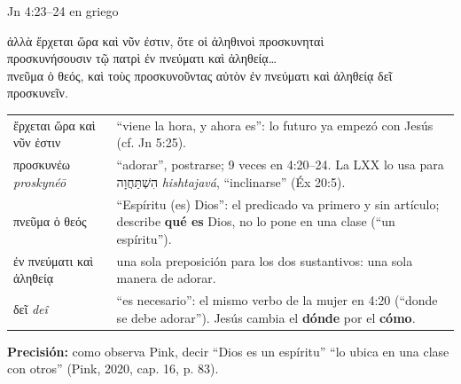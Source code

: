 \documentclass[hyperref={bookmarks=false},aspectratio=169]{beamer}
\newcommand{\heb}[1]{\mbox{\foreignlanguage{hebrew}{#1}}}
\newcommand{\grc}[1]{\foreignlanguage{ancientgreek}{#1}}
\newcommand{\destacar}[1]{\textbf{\textcolor{azul}{#1}}}
\newcommand{\precision}[1]{{\footnotesize\color{gris}\textbf{Precisión:} #1}}
\begin{document}
\begin{frame}{Jn 4:23--24 en griego}
\begin{center}\grc{ἀλλὰ ἔρχεται ὥρα καὶ νῦν ἐστιν, ὅτε οἱ ἀληθινοὶ προσκυνηταὶ}\\[1pt]\grc{προσκυνήσουσιν τῷ πατρὶ ἐν πνεύματι καὶ ἀληθείᾳ\ldots}\\[1pt]\grc{πνεῦμα ὁ θεός, καὶ τοὺς προσκυνοῦντας αὐτὸν ἐν πνεύματι καὶ ἀληθείᾳ δεῖ προσκυνεῖν.}\end{center}
\scriptsize\renewcommand{\arraystretch}{1.1}
\begin{tabular}{@{}>{\RaggedRight\arraybackslash}p{3.3cm}>{\RaggedRight\arraybackslash}p{8.5cm}@{}}
\toprule
\grc{ἔρχεται ὥρα καὶ νῦν ἐστιν} & ``viene la hora, y ahora es'': lo futuro ya empezó con Jesús (cf. Jn 5:25). \\
\grc{προσκυνέω} \emph{proskynéō} & ``adorar'', postrarse; 9 veces en 4:20--24. La LXX lo usa para \heb{הִשְׁתַּחֲוָה} \emph{hishtajavá}, ``inclinarse'' (Éx 20:5). \\
\grc{πνεῦμα ὁ θεός} & ``Espíritu (es) Dios'': el predicado va primero y sin artículo; describe \destacar{qué es} Dios, no lo pone en una clase (``un espíritu''). \\
\grc{ἐν πνεύματι καὶ ἀληθείᾳ} & una sola preposición para los dos sustantivos: una sola manera de adorar. \\
\grc{δεῖ} \emph{deî} & ``es necesario'': el mismo verbo de la mujer en 4:20 (``donde se debe adorar''). Jesús cambia el \destacar{dónde} por el \destacar{cómo}. \\
\bottomrule
\end{tabular}\par\smallskip
\precision{como observa Pink, decir ``Dios es un espíritu'' ``lo ubica en una clase con otros'' (Pink, 2020, cap. 16, p. 83).}
\end{frame}
\end{document}
